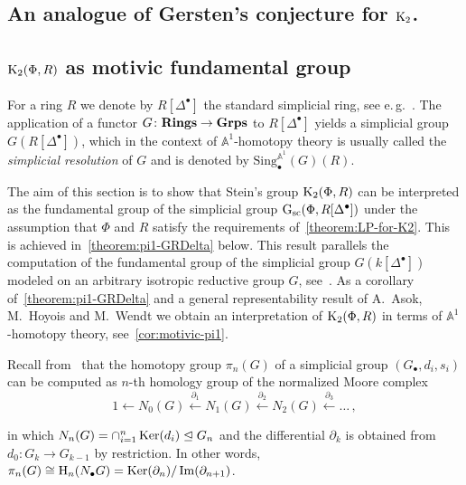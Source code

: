 \documentclass[oneside, 11pt]{amsart} \pdfoutput=1
\begin{document}
\subsection{An analogue of Gersten's conjecture for ${\mathrm{K}}_2$.} \label{sec:K2-GC}

\subsection{\texorpdfstring{${\mathrm{K}}_2(\Phi, R)$}{K2(R)} as motivic fundamental group}
For a ring $R$ we denote by $R[\Delta^\bullet]$ the standard simplicial ring, see e.\,g.~\cite{Jar83}. The application of a functor $G\colon{\normalfont\textbf{Rings}}\rightarrow{\normalfont\textbf{Grps}}$ to $R[\Delta^\bullet]$ yields a simplicial group $G(R[\Delta^\bullet])$, which in the context of $\mathbb{A}^1$-homotopy theory is usually called the {\it simplicial resolution} of $G$ and is denoted by $\mathrm{Sing}^{\mathbb{A}^1}_\bullet(G)(R)$.

The aim of this section is to show that Stein's group ${\mathrm{K}}_2(\Phi, R)$ can be interpreted as the fundamental group of the simplicial group $\mathrm{G}_\mathrm{sc}(\Phi, R[\Delta^\bullet])$ under the assumption that $\Phi$ and $R$ satisfy the requirements of~\cref{theorem:LP-for-K2}. This is achieved in~\cref{theorem:pi1-GRDelta} below. This result parallels the computation of the fundamental group of the simplicial group $G(k[\Delta^\bullet])$ modeled on an arbitrary isotropic reductive group $G$, see~\cite[Proposition~3.2]{VW16}. As a corollary of~\cref{theorem:pi1-GRDelta} and a general representability result of A.~Asok, M.~Hoyois and M.~Wendt we obtain an interpretation of ${\mathrm{K}}_2(\Phi, R)$ in terms of $\mathbb{A}^1$-homotopy theory, see~\cref{cor:motivic-pi1}.

Recall from~\cite[\S~17]{May67} that the homotopy group $\pi_n(G)$ of a simplicial group $(G_\bullet, d_i, s_i)$ can be computed as $n$-th homology group of the normalized Moore complex
\[
1 \leftarrow N_0(G) \xleftarrow{\partial_1} N_1(G) \xleftarrow{\partial_2} N_2(G) \xleftarrow{\partial_3} \ldots\,,
\]
\iffalse\[\begin{tikzcd} 1 & N_0(G) \ar[l] & N_1(G) \ar{l}[swap]{\partial_1} & N_2(G) \ar{l}[swap]{\partial_2} & \ar{l}[swap]{\partial_3} \ldots, \end{tikzcd} \] \fi
in which $N_n(G) = \cap_{i=1}^n\mathop{\mathrm{Ker}}\nolimits(d_i) \trianglelefteq G_n$ and the differential $\partial_k$ is obtained from $d_0\colon G_k \to G_{k-1}$ by restriction. In other words, $\pi_n(G) \cong \mathrm{H}_n(N_\bullet G) = \mathop{\mathrm{Ker}}\nolimits(\partial_n) / \mathop{\mathrm{Im}}\nolimits(\partial_{n+1})$.
\end{document}
